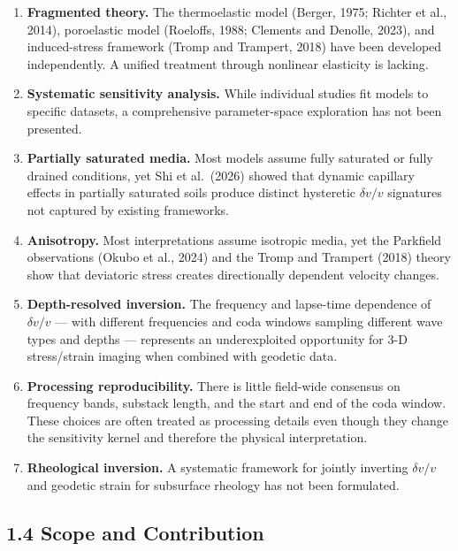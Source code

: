 \documentclass[12pt]{article}
\begin{document}
\begin{enumerate}
\def\labelenumi{\arabic{enumi}.}
\item
  \textbf{Fragmented theory.} The thermoelastic model (Berger, 1975;
  Richter et al., 2014), poroelastic model (Roeloffs, 1988; Clements and
  Denolle, 2023), and induced-stress framework (Tromp and Trampert,
  2018) have been developed independently. A unified treatment through
  nonlinear elasticity is lacking.
\item
  \textbf{Systematic sensitivity analysis.} While individual studies fit
  models to specific datasets, a comprehensive parameter-space
  exploration has not been presented.
\item
  \textbf{Partially saturated media.} Most models assume fully saturated
  or fully drained conditions, yet Shi et al.~(2026) showed that dynamic
  capillary effects in partially saturated soils produce distinct
  hysteretic \(\delta v/v\) signatures not captured by existing
  frameworks.
\item
  \textbf{Anisotropy.} Most interpretations assume isotropic media, yet
  the Parkfield observations (Okubo et al., 2024) and the Tromp and
  Trampert (2018) theory show that deviatoric stress creates
  directionally dependent velocity changes.
\item
  \textbf{Depth-resolved inversion.} The frequency and lapse-time
  dependence of \(\delta v/v\) --- with different frequencies and coda
  windows sampling different wave types and depths --- represents an
  underexploited opportunity for 3-D stress/strain imaging when combined
  with geodetic data.
\item
  \textbf{Processing reproducibility.} There is little field-wide
  consensus on frequency bands, substack length, and the start and end
  of the coda window. These choices are often treated as processing
  details even though they change the sensitivity kernel and therefore
  the physical interpretation.
\item
  \textbf{Rheological inversion.} A systematic framework for jointly
  inverting \(\delta v/v\) and geodetic strain for subsurface rheology
  has not been formulated.
\end{enumerate}

\subsection{1.4 Scope and Contribution}\label{scope-and-contribution}
\end{document}
